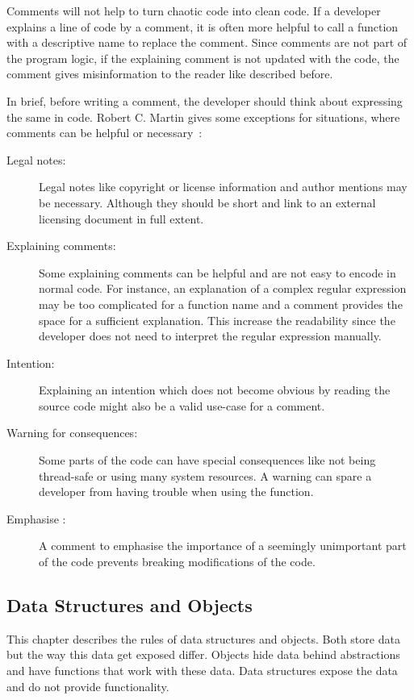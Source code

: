 Comments will not help to turn chaotic code into clean code. If a developer explains a line of code by a comment, it is often more helpful to call a function with a descriptive name to replace the comment. Since comments are not part of the program logic, if the explaining comment is not updated with the code, the comment gives misinformation to the reader like described before.

In brief, before writing a comment, the developer should think about expressing the same in code. Robert C. Martin gives some exceptions for situations, where comments can be helpful or necessary~\cite{martin_clean_2009}:

\begin{description}
    \item[Legal notes:] Legal notes like copyright or license information and author mentions may be necessary. Although they should be short and link to an external licensing document in full extent.
    \item[Explaining comments:] Some explaining comments can be helpful and are not easy to encode in normal code. For instance, an explanation of a complex regular expression may be too complicated for a function name and a comment provides the space for a sufficient explanation. This increase the readability since the developer does not need to interpret the regular expression manually.
    \item[Intention:] Explaining an intention which does not become obvious by reading the source code might also be a valid use-case for a comment. 
    \item[Warning for consequences:] Some parts of the code can have special consequences like not being thread-safe or using many system resources. A warning can spare a developer from having trouble when using the function.
    \item[Emphasise :] A comment to emphasise the importance of a seemingly unimportant part of the code prevents breaking modifications of the code. 
\end{description}

\subsection{Data Structures and Objects}
This chapter describes the rules of data structures and objects. Both store data but the way this data get exposed differ. Objects hide data behind abstractions and have functions that work with these data. Data structures expose the data and do not provide functionality. 

